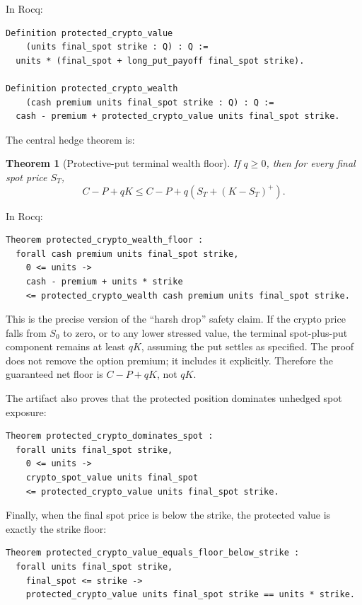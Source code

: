 \documentclass[11pt]{article}
\newtheorem{theorem}{Theorem}
\begin{document}
In Rocq:

\begin{lstlisting}[language=Coq]
Definition protected_crypto_value
    (units final_spot strike : Q) : Q :=
  units * (final_spot + long_put_payoff final_spot strike).

Definition protected_crypto_wealth
    (cash premium units final_spot strike : Q) : Q :=
  cash - premium + protected_crypto_value units final_spot strike.
\end{lstlisting}

The central hedge theorem is:

\begin{theorem}[Protective-put terminal wealth floor]
If \(q \geq 0\), then for every final spot price \(S_T\),
\[
  C - P + qK
  \leq
  C - P + q\left(S_T + (K - S_T)^+\right).
\]
\end{theorem}

In Rocq:

\begin{lstlisting}[language=Coq]
Theorem protected_crypto_wealth_floor :
  forall cash premium units final_spot strike,
    0 <= units ->
    cash - premium + units * strike
    <= protected_crypto_wealth cash premium units final_spot strike.
\end{lstlisting}

This is the precise version of the ``harsh drop'' safety claim. If the crypto
price falls from \(S_0\) to zero, or to any lower stressed value, the terminal
spot-plus-put component remains at least \(qK\), assuming the put settles as
specified. The proof does not remove the option premium; it includes it
explicitly. Therefore the guaranteed net floor is \(C - P + qK\), not \(qK\).

The artifact also proves that the protected position dominates unhedged spot
exposure:

\begin{lstlisting}[language=Coq]
Theorem protected_crypto_dominates_spot :
  forall units final_spot strike,
    0 <= units ->
    crypto_spot_value units final_spot
    <= protected_crypto_value units final_spot strike.
\end{lstlisting}

Finally, when the final spot price is below the strike, the protected value is
exactly the strike floor:

\begin{lstlisting}[language=Coq]
Theorem protected_crypto_value_equals_floor_below_strike :
  forall units final_spot strike,
    final_spot <= strike ->
    protected_crypto_value units final_spot strike == units * strike.
\end{lstlisting}
\end{document}
